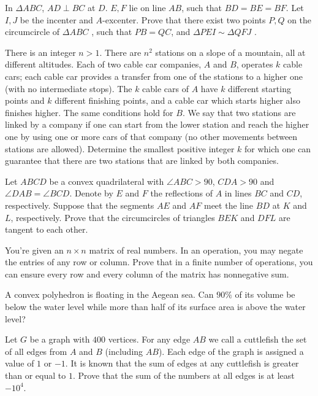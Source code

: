 \documentclass[11pt]{scrartcl}
\begin{document}
\begin{problem}[8402748184217471405]
In $\Delta ABC$, $AD \perp BC$ at $D$. $E,F$ lie on line $AB$, such that $BD=BE=BF$. Let $I,J$ be the incenter and $A$-excenter. Prove that there exist two points $P,Q$ on the circumcircle of $\Delta ABC$ , such that $PB=QC$, and $\Delta PEI \sim \Delta QFJ$ .
\end{problem}
\begin{problem}[695330092247108707]
There is an integer $n > 1$. There are $n^2$ stations on a slope of a mountain, all at different altitudes. Each of two cable car companies, $A$ and $B$, operates $k$ cable cars; each cable car provides a transfer from one of the stations to a higher one (with no intermediate stops). The $k$ cable cars of $A$ have $k$ different starting points and $k$ different finishing points, and a cable car which starts higher also finishes higher. The same conditions hold for $B$. We say that two stations are linked by a company if one can start from the lower station and reach the higher one by using one or more cars of that company (no other movements between stations are allowed). Determine the smallest positive integer $k$ for which one can guarantee that there are two stations that are linked by both companies.
\end{problem}
\begin{problem}[728988632553727]
Let $ABCD$ be a convex quadrilateral with $\angle ABC>90$, $CDA>90$ and $\angle DAB=\angle BCD$. Denote by $E$ and $F$ the reflections of $A$ in lines $BC$ and $CD$, respectively. Suppose that the segments $AE$ and $AF$ meet the line $BD$ at $K$ and $L$, respectively. Prove that the circumcircles of triangles $BEK$ and $DFL$ are tangent to each other.
\end{problem}
\begin{problem}[329951351081287]
  You're given an $n \times n$ matrix of real numbers.
  In an operation, you may negate the entries of any row or column.
  Prove that in a finite number of operations,
  you can ensure every row and every column of the matrix has nonnegative sum.
\end{problem}
\begin{problem}[241697479443718]
  A convex polyhedron is floating in the Aegean sea.
  Can $90 \%$ of its volume be below the water level
  while more than half of its surface area is above the water level?
\end{problem}
\begin{problem}[5347245479409093202]
Let $G$ be a graph with $400$ vertices. For any edge $AB$ we call a cuttlefish the set of all edges from $A$ and $B$ (including $AB$). Each edge of the graph is assigned a value of $1$ or $-1$. It is known that the sum of edges at any cuttlefish is greater than or equal to $1$.
Prove that the sum of the numbers at all edges is at least $-10^4$.
\end{problem}
\end{document}
